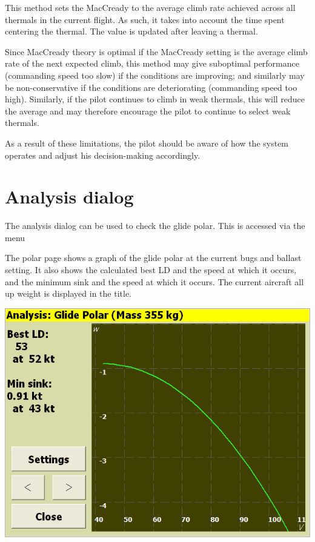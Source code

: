 \documentclass[a4paper,12pt]{refrep}
\begin{document}
This method sets the MacCready to the average climb rate achieved
across all thermals in the current flight.  As such, it takes into
account the time spent centering the thermal.  The value is updated
after leaving a thermal.

Since MacCready theory is optimal if the MacCready setting is the
average climb rate of the next expected climb, this method may give
suboptimal performance (commanding speed too slow) if the conditions
are improving; and similarly may be non-conservative if the conditions
are deteriorating (commanding speed too high).  Similarly, if the pilot
continues to climb in weak thermals, this will reduce the average
and may therefore encourage the pilot to continue to select weak thermals.

As a result of these limitations, the pilot should be aware of how the
system operates and adjust his decision-making accordingly.

\section{Analysis dialog}

The analysis dialog can be used to check the glide polar.  This is
accessed via the menu 
\begin{quote}
\blink{}
\end{quote}

The polar page shows a graph of the glide polar at the current bugs
and ballast setting.  It also shows the calculated best LD and the
speed at which it occurs, and the minimum sink and the speed at which
it occurs.  The current aircraft all up weight is displayed in the
title.

\begin{center}
\includegraphics[angle=0,width=0.8\linewidth,keepaspectratio='true']{figures/analysis-glidepolar.png}
\end{center}
\end{document}
